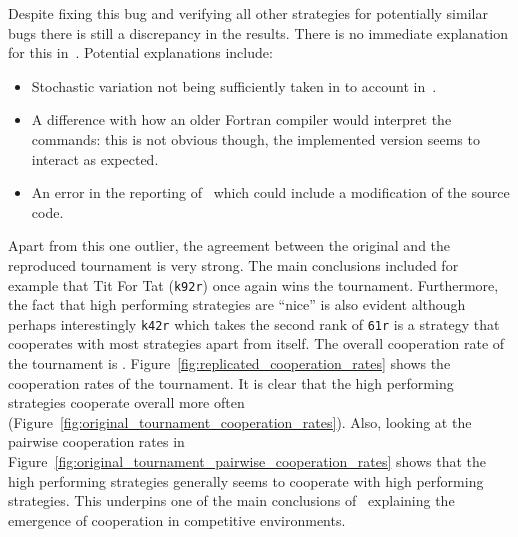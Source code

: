 \documentclass{article}
\begin{document}

Despite fixing this bug and verifying all other strategies for potentially
similar bugs there is still a discrepancy in the results.
There is no immediate explanation for this
in~\cite{Axelrod1980b}. Potential explanations include:

\begin{itemize}
    \item Stochastic variation not being sufficiently taken in to account
        in~\cite{Axelrod1980b}.
    \item A difference with how an older Fortran compiler would interpret the
        commands: this is not obvious though, the implemented version seems to
        interact as expected.
    \item An error in the reporting of~\cite{Axelrod1980b} which could include
        a modification of the source code.
\end{itemize}

Apart from this one outlier, the agreement between the original and the
reproduced tournament is very strong. The main conclusions included for example
that Tit For Tat (\texttt{k92r}) once again wins the tournament. Furthermore,
the fact that high performing strategies are ``nice'' is also evident although
perhaps interestingly \texttt{k42r} which takes the second rank of \texttt{61r} 
is a strategy that cooperates with most strategies apart from itself.
The overall cooperation rate of the tournament
is .
Figure~\ref{fig:replicated_cooperation_rates} shows the
cooperation rates of the tournament. It is clear that the high performing
strategies cooperate overall more often
(Figure~\ref{fig:original_tournament_cooperation_rates}). Also, looking at the
pairwise cooperation rates in
Figure~\ref{fig:original_tournament_pairwise_cooperation_rates} shows that the 
high
performing strategies generally seems to cooperate with high performing
strategies. This underpins one of the main conclusions of~\cite{Axelrod1980b}
explaining the emergence of cooperation in competitive environments.
\end{document}
